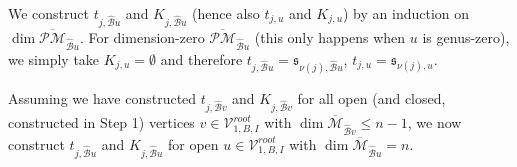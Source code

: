\documentclass[11pt]{amsart}
\theoremstyle{definition}
\theoremstyle{remark}
\newcommand{\oPMb}{{\overline{\mathcal{PM}}}}
\newcommand{\<}{\left<}
\renewcommand{\>}{\right>}
\numberwithin{equation}{section}
\def\Mbar{{\overline{\mathcal M}}}
\begin{document}
    We construct $t_{j,{\hat{\mathcal B}u}}$ and $K_{j,{\hat{\mathcal B}u}}$ (hence also $t_{j,u}$ and $K_{j,u}$) by an induction on $\dim \oPMb_{\hat{\mathcal B}u}$. For dimension-zero $\oPMb_{\hat{\mathcal B}u}$ (this only happens when $u$ is genus-zero), 
    we simply take $K_{j,u}=\emptyset$ and therefore $t_{j,\hat{\mathcal B}u}=\mathfrak{s}_{\nu(j),\hat{\mathcal B}u}$, $t_{j,u}=\mathfrak{s}_{\nu(j),u}$.

    Assuming we have constructed $t_{j,{\hat{\mathcal B}v}}$ and $K_{j,{\hat{\mathcal B}v}}$ for all open (and closed, constructed in Step 1) vertices $v\in \mathcal V^{root}_{1,B,I}$ with $\dim \Mbar_{\hat{\mathcal B}v} \le n-1$, we now construct  $t_{j,{\hat{\mathcal B}u}}$ and $K_{j,{\hat{\mathcal B}u}}$ for open $u\in \mathcal V^{root}_{1,B,I}$  with $\dim \Mbar_{\hat{\mathcal B}u} = n$.
\end{document}
